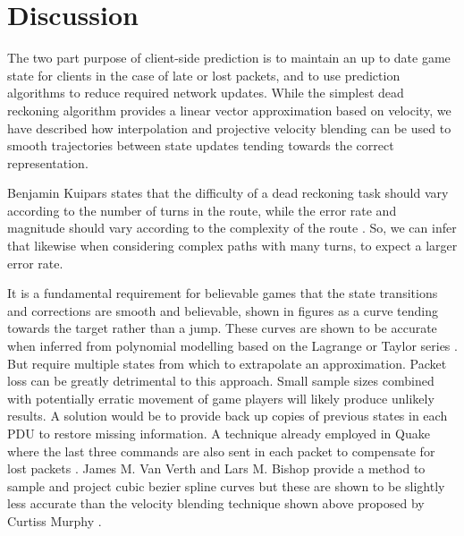 \documentclass[journal]{IEEEtran}
\begin{document}

\section{Discussion} \label{discussion}

The two part purpose of client-side prediction is to maintain an up to date game state for clients in the case of late or lost packets, and to use prediction algorithms to reduce required network updates. While the simplest dead reckoning algorithm provides a linear vector approximation based on velocity, we have described how interpolation and projective velocity blending can be used to smooth trajectories between state updates tending towards the correct representation.

Benjamin Kuipars states that the difficulty of a dead reckoning task should vary according to the number of turns in the route, while the error rate and magnitude should vary according to the complexity of the route \cite{kuipers1978modeling}. So, we can infer that likewise when considering complex paths with many turns, to expect a larger error rate.

It is a fundamental requirement for believable games that the state transitions and corrections are smooth and believable, shown in figures as a curve tending towards the target rather than a jump. These curves are shown to be accurate when inferred from polynomial modelling based on the Lagrange or Taylor series \cite{hanawa2006proposal}. But require multiple states from which to extrapolate an approximation. Packet loss can be greatly detrimental to this approach. Small sample sizes combined with potentially erratic movement of game players will likely produce unlikely results. A solution would be to provide back up copies of previous states in each PDU to restore missing information. A technique already employed in Quake where the last three commands are also sent in each packet to compensate for lost packets \cite{cronin2001distributed}. James M. Van Verth and Lars M. Bishop provide a method to sample and project cubic bezier spline curves \cite{van2008essential} but these are shown to be slightly less accurate than the velocity blending technique shown above proposed by Curtiss Murphy \cite{murphy2011believable}. 
\end{document}
